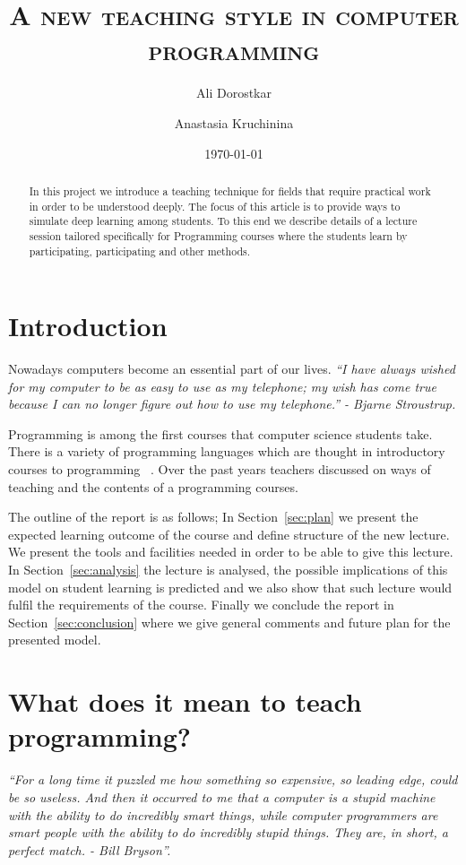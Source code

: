 \documentclass{article}
\author{Ali Dorostkar \and Anastasia Kruchinina}
\title{\textsc{A new teaching style in computer programming}}
\date{\today}
\begin{document}
\maketitle \begin{abstract}
In this project we introduce a teaching technique for fields that require
practical work in order to be understood deeply. The focus of this article is 
to provide ways to simulate deep learning among students. To this end we describe 
details of a lecture session tailored specifically for Programming courses
where the students learn by participating, participating and other methods.
\end{abstract}

\section{Introduction} %
\label{sec:introduction}

Nowadays computers become an essential part of our lives.  \emph{``I have always wished
for my computer to be as easy to use as my telephone; my wish has come true
because I can no longer figure out how to use my telephone.'' - Bjarne
Stroustrup.}  

Programming is among the first courses that computer science students take.
There is a variety of programming languages which are thought in introductory
courses to programming ~\cite{de2002language}. Over the past years teachers
discussed on ways of teaching and the contents of a programming courses.

The outline of the report is as follows; In Section~\ref{sec:plan} we present the expected learning outcome of the course and define structure of the new lecture. We present the tools and facilities needed in order to be able to give this lecture. In Section~\ref{sec:analysis} the lecture is analysed, the possible implications of this model on student learning is predicted and we also show that such lecture would fulfil the requirements of the course. Finally we conclude the report in Section~\ref{sec:conclusion} where we give general comments and future plan for the presented model.

\section{What does it mean to teach programming?}


\emph{``For a long time it puzzled me how something so expensive, so leading edge,
could be so useless. And then it occurred to me that a computer is a stupid
machine with the ability to do incredibly smart things, while computer
programmers are smart people with the ability to do incredibly stupid things.
They are, in short, a perfect match. - Bill Bryson''.}
\end{document}
